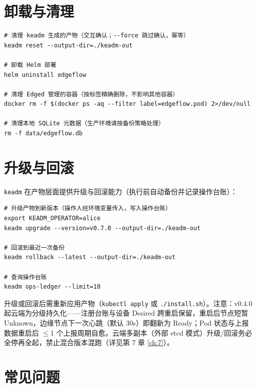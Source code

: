\section{卸载与清理}

\begin{lstlisting}
# 清理 keadm 生成的产物（交互确认；--force 跳过确认，幂等）
keadm reset --output-dir=./keadm-out

# 卸载 Helm 部署
helm uninstall edgeflow

# 清理 Edged 管理的容器（按标签精确删除，不影响其他容器）
docker rm -f $(docker ps -aq --filter label=edgeflow.pod) 2>/dev/null

# 清理本地 SQLite 元数据（生产环境请按备份策略处理）
rm -f data/edgeflow.db
\end{lstlisting}

\section{升级与回滚}

\texttt{keadm} 在产物层面提供升级与回滚能力（执行前自动备份并记录操作台账）：

\begin{lstlisting}
# 升级产物到新版本（操作人经环境变量传入，写入操作台账）
export KEADM_OPERATOR=alice
keadm upgrade --version=v0.7.0 --output-dir=./keadm-out

# 回滚到最近一次备份
keadm rollback --latest --output-dir=./keadm-out

# 查询操作台账
keadm ops-ledger --limit=10
\end{lstlisting}

升级或回滚后需重新应用产物（\texttt{kubectl apply} 或 \texttt{./install.sh}）。注意：v0.4.0 起云端为分级持久化——注册台账与设备 Desired 跨重启保留，重启后节点短暂 Unknown，边缘节点下一次心跳（默认 30s）即翻新为 Ready；Pod 状态与上报数据重启后 $\le$1 个上报周期自愈。云端多副本（外部 etcd 模式）升级/回滚务必全停再全起，禁止混合版本混跑（详见第 7 章 \autoref{ch:7}）。

\section{常见问题}

